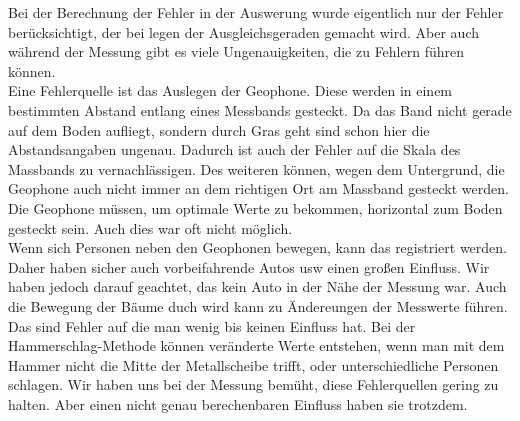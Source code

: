 Bei der Berechnung der Fehler in der Auswerung wurde eigentlich nur der Fehler berücksichtigt, der bei legen der Ausgleichsgeraden gemacht wird. Aber auch während der Messung gibt es viele Ungenauigkeiten, die zu Fehlern führen können. \\
Eine Fehlerquelle ist das Auslegen der Geophone. Diese werden in einem bestimmten Abstand entlang eines Messbands gesteckt. Da das Band nicht gerade auf dem Boden aufliegt, sondern durch Gras geht sind schon hier die Abstandsangaben ungenau. Dadurch ist auch der Fehler auf die Skala des Massbands zu vernachlässigen. Des weiteren können, wegen dem Untergrund, die Geophone auch nicht immer an dem richtigen Ort am Massband gesteckt werden. Die Geophone müssen, um optimale Werte zu bekommen, horizontal zum Boden gesteckt sein. Auch dies war oft nicht möglich.\\
Wenn sich Personen neben den Geophonen bewegen, kann das registriert werden. Daher haben sicher auch vorbeifahrende Autos usw einen großen Einfluss. Wir haben jedoch darauf geachtet, das kein Auto in der Nähe der Messung war. Auch die Bewegung der Bäume duch wird kann zu Ändereungen der Messwerte führen. Das sind Fehler auf die man wenig bis keinen Einfluss hat. 
Bei der Hammerschlag-Methode können veränderte Werte entstehen, wenn man mit dem Hammer nicht die Mitte der Metallscheibe trifft, oder unterschiedliche Personen schlagen. 
Wir haben uns bei der Messung bemüht, diese Fehlerquellen gering zu halten. Aber einen nicht genau berechenbaren Einfluss haben sie trotzdem.